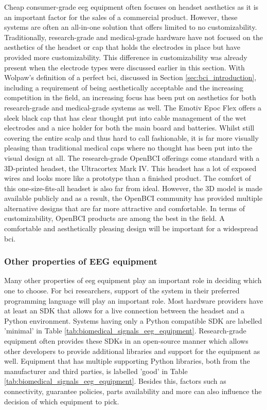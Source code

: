 Cheap consumer-grade \gls{eeg} equipment often focuses on headset aesthetics as it is an important factor for the sales of a commercial product. 
However, these systems are often an all-in-one solution that offers limited to no customizability.
Traditionally, research-grade and medical-grade hardware have not focused on the aesthetics of the headset or cap that holds the electrodes in place but have provided more customizability.
This difference in customizability was already present when the electrode types were discussed earlier in this section.
With Wolpaw's definition of a perfect \gls{bci}, discussed in Section \ref{sec:bci_introduction}, including a requirement of being aesthetically acceptable and the increasing competition in the field, an increasing focus has been put on aesthetics for both research-grade and medical-grade systems as well.
The Emotiv Epoc Flex offers a sleek black cap that has clear thought put into cable management of the wet electrodes and a nice holder for both the main board and batteries.
Whilst still covering the entire scalp and thus hard to call fashionable, it is far more visually pleasing than traditional medical caps where no thought has been put into the visual design at all.
The research-grade OpenBCI offerings come standard with a 3D-printed headset, the Ultracortex Mark IV.
This headset has a lot of exposed wires and looks more like a prototype than a finished product.
The comfort of this one-size-fits-all headset is also far from ideal.
However, the 3D model is made available publicly and as a result, the OpenBCI community has provided multiple alternative designs that are far more attractive and comfortable.
In terms of customizability, OpenBCI products are among the best in the field.
A comfortable and aesthetically pleasing design will be important for a widespread \gls{bci}.




\subsubsection{Other properties of EEG equipment}
\label{subsubsec:biomedical_signals_measuring_brain_equipment_others}

Many other properties of \gls{eeg} equipment play an important role in deciding which one to choose.
For \gls{bci} researchers, support of the system in their preferred programming language will play an important role.
Most hardware providers have at least an SDK that allows for a live connection between the headset and a Python environment.
Systems having only a Python compatible SDK are labelled 'minimal' in Table \ref{tab:biomedical_signals_eeg_equipment}.
Research-grade equipment often provides these SDKs in an open-source manner which allows other developers to provide additional libraries and support for the equipment as well. 
Equipment that has multiple supporting Python libraries, both from the manufacturer and third parties, is labelled 'good' in Table \ref{tab:biomedical_signals_eeg_equipment}.
Besides this, factors such as connectivity, guarantee policies, parts availability and more can also influence the decision of which equipment to pick.



